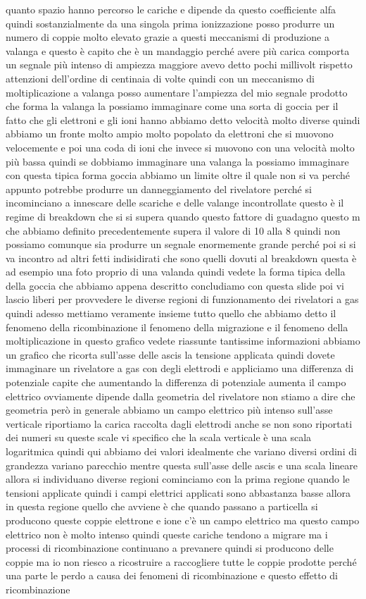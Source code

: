 {quanto spazio hanno percorso le cariche e dipende da questo coefficiente alfa quindi sostanzialmente da una singola prima ionizzazione posso produrre un numero di coppie molto elevato grazie a questi meccanismi di produzione a valanga e questo è capito che è un mandaggio perché avere più carica comporta un segnale più intenso di ampiezza maggiore avevo detto pochi millivolt rispetto attenzioni dell'ordine di centinaia di volte quindi con un meccanismo di moltiplicazione a valanga posso aumentare l'ampiezza del mio segnale prodotto che forma la valanga la possiamo immaginare come una sorta di goccia per il fatto che gli elettroni e gli ioni hanno abbiamo detto velocità molto diverse quindi abbiamo un fronte molto ampio molto popolato da elettroni che si muovono velocemente e poi una coda di ioni che invece si muovono con una velocità molto più bassa quindi se dobbiamo immaginare una valanga la possiamo immaginare con questa tipica forma goccia abbiamo un limite oltre il quale non si va perché appunto potrebbe produrre un danneggiamento del rivelatore perché si incominciano a innescare delle scariche e delle valange incontrollate questo è il regime di breakdown che si si supera quando questo fattore di guadagno questo m che abbiamo definito precedentemente supera il valore di 10 alla 8 quindi non possiamo comunque sia produrre un segnale enormemente grande perché poi si si va incontro ad altri fetti indisidirati che sono quelli dovuti al breakdown questa è ad esempio una foto proprio di una valanda quindi vedete la forma tipica della della goccia che abbiamo appena descritto concludiamo con questa slide poi vi lascio liberi per provvedere le diverse regioni di funzionamento dei rivelatori a gas quindi adesso mettiamo veramente insieme tutto quello che abbiamo detto il fenomeno della ricombinazione il fenomeno della migrazione e il fenomeno della moltiplicazione in questo grafico vedete riassunte tantissime informazioni abbiamo un grafico che ricorta sull'asse delle ascis la tensione applicata quindi dovete immaginare un rivelatore a gas con degli elettrodi e appliciamo una differenza di potenziale capite che aumentando la differenza di potenziale aumenta il campo elettrico ovviamente dipende dalla geometria del rivelatore non stiamo a dire che geometria però in generale abbiamo un campo elettrico più intenso sull'asse verticale riportiamo la carica raccolta dagli elettrodi anche se non sono riportati dei numeri su queste scale vi specifico che la scala verticale è una scala logaritmica quindi qui abbiamo dei valori idealmente che variano diversi ordini di grandezza variano parecchio mentre questa sull'asse delle ascis e una scala lineare allora si individuano diverse regioni cominciamo con la prima regione quando le tensioni applicate quindi i campi elettrici applicati sono abbastanza basse allora in questa regione quello che avviene è che quando passano a particella si producono queste coppie elettrone e ione c'è un campo elettrico ma questo campo elettrico non è molto intenso quindi queste cariche tendono a migrare ma i processi di ricombinazione continuano a prevanere quindi si producono delle coppie ma io non riesco a ricostruire a raccogliere tutte le coppie prodotte perché una parte le perdo a causa dei fenomeni di ricombinazione e questo effetto di ricombinazione }
